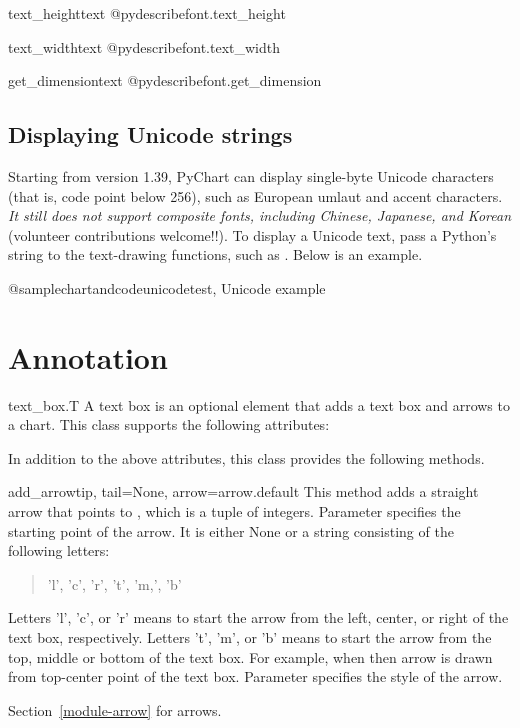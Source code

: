 \documentclass{howto}
\newcommand{\pychart}{PyChart}
\begin{document}
\begin{funcdesc}{text_height}{text}
@pydescribe{font.text_height}
\end{funcdesc}

\begin{funcdesc}{text_width}{text}
@pydescribe{font.text_width}
\end{funcdesc}

\begin{funcdesc}{get_dimension}{text}
@pydescribe{font.get_dimension}
\end{funcdesc}

\subsection{Displaying Unicode strings}

Starting from version 1.39, \pychart{} can display single-byte Unicode
characters (that is, code point below 256), such as European umlaut
and accent characters. \emph{It still does not support composite
  fonts, including Chinese, Japanese, and Korean} (volunteer
contributions welcome!!). To display a Unicode text, pass a Python's
 string to the text-drawing functions, such as
.  Below is an example.

@samplechartandcode{unicodetest, Unicode example}

\section{Annotation}

\begin{classdesc*}{text_box.T}
A text box is an optional element that adds a text box and arrows to a
chart.  This class supports the following attributes:
\end{classdesc*}


In addition to the above attributes, this class
provides the following methods.

\begin{methoddesc}{add_arrow}{tip, tail=None, arrow=arrow.default}
This method adds a straight arrow that points to , which is
a tuple of integers. Parameter 
specifies the starting point of the
arrow. It is either None or a string consisting of the following
letters:
\begin{quote}
'l', 'c', 'r', 't', 'm,', 'b'
\end{quote}

Letters 'l', 'c', or 'r'
means to start the arrow from the left, center, or right of the text
box, respectively. Letters 't', 'm', or 'b' means to start the arrow
from the top, middle or bottom of the text box.  For example, when
 then arrow is drawn from top-center point of the text
box. Parameter  specifies the style of the arrow.

\begin{seealso}
Section~\ref{module-arrow} for arrows.
\end{seealso}
\end{methoddesc}
\end{document}
